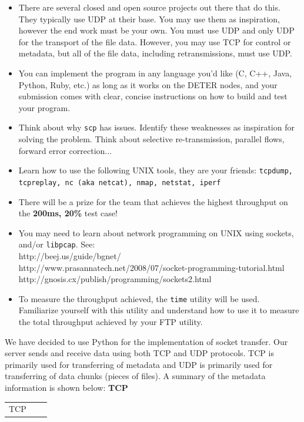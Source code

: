\documentclass[10pt]{article}
\begin{document}
\begin{itemize}
\itemsep0em
\item There are several closed and open source projects out there that do this. They typically use UDP at their base. You may use them as inspiration, however the end work must be your own. You must use UDP and only UDP for the transport of the file data. However, you may use TCP for control or metadata, but all of the file data, including retransmissions, must use UDP.
\item You can implement the program in any language you'd like (C, C++, Java, Python, Ruby, etc.) as long as it works on the DETER nodes, and your submission comes with clear, concise instructions on how to build and test your program.
\item Think about why \texttt{scp} has issues. Identify these weaknesses as inspiration for solving the problem. Think about selective re-transmission, parallel flows, forward error correction...
\item Learn how to use the following UNIX tools, they are your friends: \texttt{tcpdump, tcpreplay, nc (aka netcat), nmap, netstat, iperf}
\item There will be a prize for the team that achieves the highest throughput on the \textbf{200ms, 20\%} test case!
\item You may need to learn about network programming on UNIX using sockets, and/or \texttt{libpcap}. See: \\
http://beej.us/guide/bgnet/\\
http://www.prasannatech.net/2008/07/socket-programming-tutorial.html\\
http://gnosis.cx/publish/programming/sockets2.html
\item To measure the throughput achieved, the \texttt{time} utility will be used. Familiarize yourself with this utility and understand how to use it to measure the total throughput achieved by your FTP utility.
\end{itemize}

\newpage
We have decided to use Python for the implementation of socket transfer.  Our server sends and receive data using both TCP and UDP protocols.  TCP is primarily used for transferring of metadata and UDP is primarily used for transferring of data chunks (pieces of files).  A summary of the metadata information is shown below:
\textbf{TCP}
\begin{tabular}{| c | c | c |}
\hline
TCP & 
\hline
\end{tabular}
\end{document}
